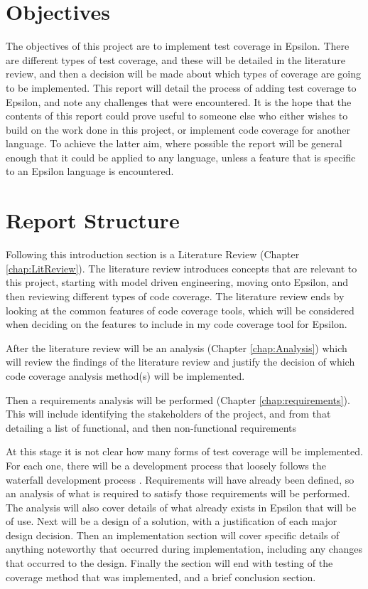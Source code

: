 \section{Objectives}

The objectives of this project are to implement test coverage in Epsilon. There are different types of test coverage, and these will be detailed in the literature review, and then a decision will be made about which types of coverage are going to be implemented. This report will detail the process of adding test coverage to Epsilon, and note any challenges that were encountered. It is the hope that the contents of this report could prove useful to someone else who either wishes to build on the work done in this project, or implement code coverage for another language. To achieve the latter aim, where possible the report will be general enough that it could be applied to any language, unless a feature that is specific to an Epsilon language is encountered.

\section{Report Structure}

Following this introduction section is a Literature Review (Chapter \ref{chap:LitReview}). The literature review introduces concepts that are relevant to this project, starting with model driven engineering, moving onto Epsilon, and then reviewing different types of code coverage. The literature review ends by looking at the common features of code coverage tools, which will be considered when deciding on the features to include in my code coverage tool for Epsilon.

After the literature review will be an analysis (Chapter \ref{chap:Analysis}) which will review the findings of the literature review and justify the decision of which code coverage analysis method(s) will be implemented.

Then a requirements analysis will be performed (Chapter \ref{chap:requirements}). This will include identifying the stakeholders of the project, and from that detailing a list of functional, and then non-functional requirements

At this stage it is not clear how many forms of test coverage will be implemented. For each one, there will be a development process that loosely follows the waterfall development process \citep{Royce:1987:MDL:41765.41801}. Requirements will have already been defined, so an analysis of what is required to satisfy those requirements will be performed. The analysis will also cover details of what already exists in Epsilon that will be of use. Next will be a design of a solution, with a justification of each major design decision. Then an implementation section will cover specific details of anything noteworthy that occurred during implementation, including any changes that occurred to the design. Finally the section will end with testing of the coverage method that was implemented, and a brief conclusion section.

